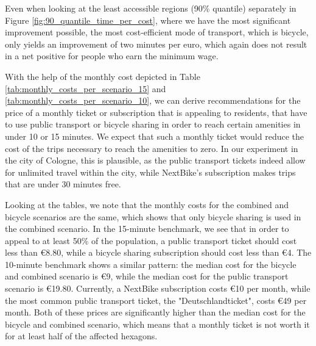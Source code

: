 Even when looking at the least accessible regions (90\% quantile) separately in Figure \ref{fig:90_quantile_time_per_cost}, where we have the most significant improvement possible, the most cost-efficient mode of transport, which is bicycle, only yields an improvement of two minutes per euro, which again does not result in a net positive for people who earn the minimum wage.

With the help of the monthly cost depicted in Table \ref{tab:monthly_costs_per_scenario_15} and \ref{tab:monthly_costs_per_scenario_10}, we can derive recommendations for the price of a monthly ticket or subscription that is appealing to residents, that have to use public transport or bicycle sharing in order to reach certain amenities in under 10 or 15 minutes.
We expect that such a monthly ticket would reduce the cost of the trips necessary to reach the amenities to zero.
In our experiment in the city of Cologne, this is plausible, as the public transport tickets indeed allow for unlimited travel within the city, while NextBike's subscription makes trips that are under 30 minutes free.

Looking at the tables, we note that the monthly costs for the combined and bicycle scenarios are the same, which shows that only bicycle sharing is used in the combined scenario.
In the 15-minute benchmark, we see that in order to appeal to at least 50\% of the population, a public transport ticket should cost less than \euro{8.80}, while a bicycle sharing subscription should cost less than \euro{4}.
The 10-minute benchmark shows a similar pattern: the median cost for the bicycle and combined scenario is \euro{9}, while the median cost for the public transport scenario is \euro{19.80}.
Currently, a NextBike subscription costs \euro{10} per month, while the most common public transport ticket, the "Deutschlandticket", costs \euro{49} per month.
Both of these prices are significantly higher than the median cost for the bicycle and combined scenario, which means that a monthly ticket is not worth it for at least half of the affected hexagons.

